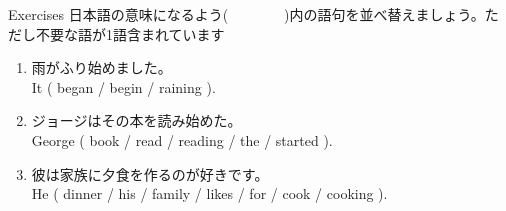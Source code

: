 \documentclass[aspectratio=169,xcolor={dvipsnames,table}]{beamer}
\begin{document}
\begin{frame}[plain]{Exercises}
日本語の意味になるよう(~~~~~~~~)内の語句を並べ替えましょう。ただし不要な語が1語含まれています%
\hfill{\scriptsize {}}
\begin{enumerate}
 \item 雨がふり始めました。\\
       It ( began / begin / raining ).\\
 \item ジョージはその本を読み始めた。\\
       George ( book / read / reading / the / started ).\\
 \item 彼は家族に夕食を作るのが好きです。\\
       He ( dinner / his / family / likes / for / cook / cooking ).\\
\end{enumerate}
\end{frame}
\end{document}
